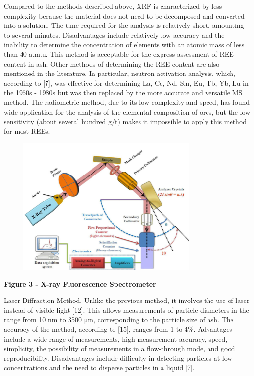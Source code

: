 Compared to the methods described above, XRF is characterized by less
complexity because the material does not need to be decomposed and
converted into a solution. The time required for the analysis is
relatively short, amounting to several minutes. Disadvantages include
relatively low accuracy and the inability to determine the concentration
of elements with an atomic mass of less than 40 a.m.u. This method is
acceptable for the express assessment of REE content in ash. Other
methods of determining the REE content are also mentioned in the
literature. In particular, neutron activation analysis, which, according
to {[}7{]}, was effective for determining La, Ce, Nd, Sm, Eu, Tb, Yb, Lu
in the 1960s - 1980s but was then replaced by the more accurate and
versatile MS method. The radiometric method, due to its low complexity
and speed, has found wide application for the analysis of the elemental
composition of ores, but the low sensitivity (about several hundred g/t)
makes it impossible to apply this method for most REEs.

\begin{figure}[H]
	\centering
	\includegraphics[width=0.8\textwidth]{assets/1051}
	\caption*{}
\end{figure}

{\bfseries Figure 3 - X-ray Fluorescence Spectrometer}

Laser Diffraction Method. Unlike the previous method, it involves the
use of laser instead of visible light {[}12{]}. This allows measurements
of particle diameters in the range from 10 nm to 3500 μm, corresponding
to the particle size of ash. The accuracy of the method, according to
{[}15{]}, ranges from 1 to 4\%. Advantages include a wide range of
measurements, high measurement accuracy, speed, simplicity, the
possibility of measurements in a flow-through mode, and good
reproducibility. Disadvantages include difficulty in detecting particles
at low concentrations and the need to disperse particles in a liquid
{[}7{]}.

